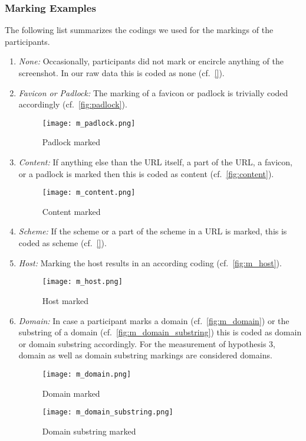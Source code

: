 \subsubsection{Marking Examples}
The following list summarizes the codings we used for the markings of the participants.

\begin{enumerate}
	\item\textit{None:} Occasionally, participants did not mark or encircle anything of the screenshot. In our raw data this is coded as none (cf.~\autoref{}).
	\item\textit{Favicon or Padlock:} The marking of a favicon or padlock is trivially coded accordingly (cf.~\autoref{fig:padlock}).
	\begin{figure}[H]
	\centering
	\texttt{[image: m\_padlock.png]}
	\caption{Padlock marked}
	\label{fig:padlock}
	\end{figure}
	\item\textit{Content:} If anything else than the URL itself, a part of the URL, a favicon, or a padlock is marked then this is coded as content (cf.~\autoref{fig:content}).
	\begin{figure}[H]
	\centering
	\texttt{[image: m\_content.png]}
	\caption{Content marked}
	\label{fig:content}
	\end{figure}
	\item\textit{Scheme:} If the scheme or a part of the scheme in a URL is marked, this is coded as scheme (cf.~\autoref{}).
	\item\textit{Host:} Marking the host results in an according coding (cf.~\autoref{fig:m_host}).
		\begin{figure}[H]
		\centering
		\texttt{[image: m\_host.png]}
		\caption{Host marked}
		\label{fig:m_host}
		\end{figure}
	\item\textit{Domain:} In case a participant marks a domain (cf.~\autoref{fig:m_domain}) or the substring of a domain (cf.~\autoref{fig:m_domain_substring}) this is coded as domain or domain substring accordingly.
For the measurement of hypothesis 3, domain as well as domain substring markings are considered domains.
\begin{figure}[H]
\centering
\texttt{[image: m\_domain.png]}
\caption{Domain marked}
\label{fig:m_domain}
\end{figure}
\begin{figure}[H]
\centering
\texttt{[image: m\_domain\_substring.png]}
\caption{Domain substring marked}
\label{fig:m_domain_substring}
\end{figure}


\end{enumerate}
